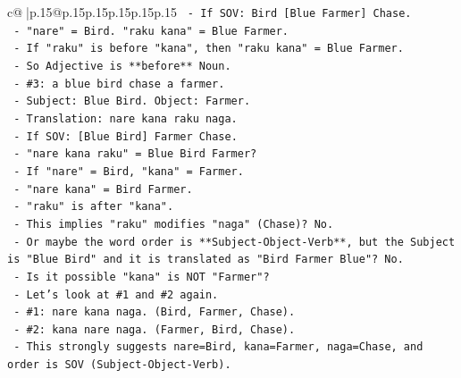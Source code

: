 \documentclass{article}
\begin{document}
{\begin{supertabular}{c@{$\;$}|p{.15\linewidth}@{}p{.15\linewidth}p{.15\linewidth}p{.15\linewidth}p{.15\linewidth}p{.15\linewidth}}
{{{\texttt{                                   {-} If SOV: Bird {[}Blue Farmer{]} Chase.} \\
\texttt{                                   {-} "nare" = Bird. "raku kana" = Blue Farmer.} \\
\texttt{                                   {-} If "raku" is before "kana", then "raku kana" = Blue Farmer.} \\
\texttt{                                   {-} So Adjective is **before** Noun.} \\
\texttt{                                 {-} \#3: a blue bird chase a farmer.} \\
\texttt{                                   {-} Subject: Blue Bird. Object: Farmer.} \\
\texttt{                                   {-} Translation: nare kana raku naga.} \\
\texttt{                                   {-} If SOV: {[}Blue Bird{]} Farmer Chase.} \\
\texttt{                                   {-} "nare kana raku" = Blue Bird Farmer?} \\
\texttt{                                   {-} If "nare" = Bird, "kana" = Farmer.} \\
\texttt{                                   {-} "nare kana" = Bird Farmer.} \\
\texttt{                                   {-} "raku" is after "kana".} \\
\texttt{                                   {-} This implies "raku" modifies "naga" (Chase)? No.} \\
\texttt{                                   {-} Or maybe the word order is **Subject{-}Object{-}Verb**, but the Subject is "Blue Bird" and it is translated as "Bird Farmer Blue"? No.} \\
\texttt{                                   {-} Is it possible "kana" is NOT "Farmer"?} \\
\texttt{                                   {-} Let's look at \#1 and \#2 again.} \\
\texttt{                                     {-} \#1: nare kana naga. (Bird, Farmer, Chase).} \\
\texttt{                                     {-} \#2: kana nare naga. (Farmer, Bird, Chase).} \\
\texttt{                                     {-} This strongly suggests nare=Bird, kana=Farmer, naga=Chase, and order is SOV (Subject{-}Object{-}Verb).} \\
}}}
\end{supertabular}}
\end{document}
